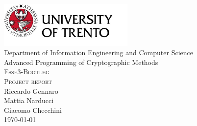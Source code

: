 \pagestyle{plain}

\thispagestyle{empty}

\begin{center}

  \includegraphics[width=0.5\textwidth]{I-initFolder/images/maxresdefault1.jpg}\\[0.5cm]

  Department of Information Engineering and Computer Science\\[3cm]

  Advanced Programming of Cryptographic Methods\\[1.5cm]

  \textsc{\huge Esse3-Bootleg}\\[0.5cm]

  \textsc{Project report}\\[1.5cm]

  Riccardo Gennaro\\
  Mattia Narducci\\
  Giacomo Checchini\\[2cm]

  {\today}

\end{center}%
